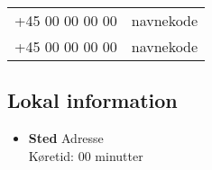 \documentclass[../../main.tex]{subfiles}
\begin{document}
\begin{multicols}{2}
\begin{tabular}{c|l}
+45 00 00 00 00 & navnekode \\

+45 00 00 00 00 & navnekode \\

\end{tabular}

\subsection{Lokal information}
\begin{itemize}
    
    \item \textbf{Sted}
        Adresse \\
        Køretid: 00 minutter
        
\end{itemize}

\end{multicols}
\end{document}
